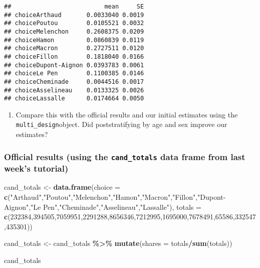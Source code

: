 \documentclass[
]{article}
\newenvironment{Shaded}{\begin{snugshade}}{\end{snugshade}}
\newcommand{\AttributeTok}[1]{\textcolor[rgb]{0.13,0.29,0.53}{#1}}
\newcommand{\DecValTok}[1]{\textcolor[rgb]{0.00,0.00,0.81}{#1}}
\newcommand{\FunctionTok}[1]{\textcolor[rgb]{0.13,0.29,0.53}{\textbf{#1}}}
\newcommand{\NormalTok}[1]{#1}
\newcommand{\OtherTok}[1]{\textcolor[rgb]{0.56,0.35,0.01}{#1}}
\newcommand{\SpecialCharTok}[1]{\textcolor[rgb]{0.81,0.36,0.00}{\textbf{#1}}}
\newcommand{\StringTok}[1]{\textcolor[rgb]{0.31,0.60,0.02}{#1}}
\providecommand{\tightlist}{%
  \setlength{\itemsep}{0pt}\setlength{\parskip}{0pt}}
\begin{document}
\begin{verbatim}
##                          mean     SE
## choiceArthaud       0.0033040 0.0019
## choicePoutou        0.0105521 0.0032
## choiceMelenchon     0.2608375 0.0209
## choiceHamon         0.0860839 0.0119
## choiceMacron        0.2727511 0.0120
## choiceFillon        0.1818040 0.0166
## choiceDupont-Aignon 0.0393783 0.0061
## choiceLe Pen        0.1100385 0.0146
## choiceCheminade     0.0044516 0.0017
## choiceAsselineau    0.0133325 0.0026
## choiceLassalle      0.0174664 0.0050
\end{verbatim}

\begin{enumerate}
\def\labelenumi{\arabic{enumi}.}
\setcounter{enumi}{4}
\tightlist
\item
  Compare this with the official results and our initial estimates using
  the \texttt{multi\_design}object. Did poststratifying by age and sex
  improve our estimates?
\end{enumerate}

\subsubsection{\texorpdfstring{Official results (using the
\texttt{cand\_totals} data frame from last week's
tutorial)}{Official results (using the cand\_totals data frame from last week's tutorial)}}\label{official-results-using-the-cand_totals-data-frame-from-last-weeks-tutorial}

\begin{Shaded}
\begin{Highlighting}[]
\NormalTok{cand\_totals }\OtherTok{\textless{}{-}} \FunctionTok{data.frame}\NormalTok{(}\AttributeTok{choice =} \FunctionTok{c}\NormalTok{(}\StringTok{"Arthaud"}\NormalTok{,}\StringTok{"Poutou"}\NormalTok{,}\StringTok{"Melenchon"}\NormalTok{,}\StringTok{"Hamon"}\NormalTok{,}\StringTok{"Macron"}\NormalTok{,}\StringTok{"Fillon"}\NormalTok{,}\StringTok{"Dupont{-}Aignon"}\NormalTok{,}\StringTok{"Le Pen"}\NormalTok{,}\StringTok{"Cheminade"}\NormalTok{,}\StringTok{"Asselineau"}\NormalTok{,}\StringTok{"Lassalle"}\NormalTok{), }\AttributeTok{totals =} \FunctionTok{c}\NormalTok{(}\DecValTok{232384}\NormalTok{,}\DecValTok{394505}\NormalTok{,}\DecValTok{7059951}\NormalTok{,}\DecValTok{2291288}\NormalTok{,}\DecValTok{8656346}\NormalTok{,}\DecValTok{7212995}\NormalTok{,}\DecValTok{1695000}\NormalTok{,}\DecValTok{7678491}\NormalTok{,}\DecValTok{65586}\NormalTok{,}\DecValTok{332547}\NormalTok{,}\DecValTok{435301}\NormalTok{))}

\NormalTok{cand\_totals }\OtherTok{\textless{}{-}}\NormalTok{ cand\_totals }\SpecialCharTok{\%\textgreater{}\%}
  \FunctionTok{mutate}\NormalTok{(}\AttributeTok{shares =}\NormalTok{ totals}\SpecialCharTok{/}\FunctionTok{sum}\NormalTok{(totals))}

\NormalTok{cand\_totals}
\end{Highlighting}
\end{Shaded}
\end{document}
